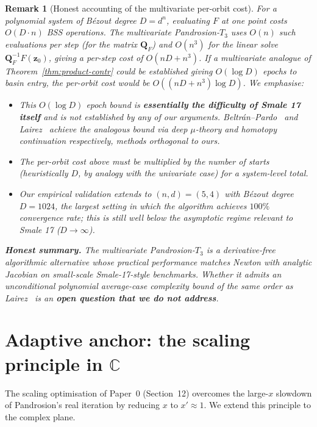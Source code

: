 \documentclass[11pt,a4paper]{article}
\newtheorem{remark}[theorem]{Remark}
\begin{document}
\begin{remark}[Honest accounting of the multivariate per-orbit cost]
For a polynomial system of B\'ezout degree $D = d^n$, evaluating $F$ at one point costs $O(D \cdot n)$ BSS operations. The multivariate Pandrosion-$T_3$ uses $O(n)$ such evaluations per step (for the matrix $\mathbf{Q}_F$) and $O(n^3)$ for the linear solve $\mathbf{Q}_F^{-1} F(\mathbf{z}_0)$, giving a per-step cost of $O(n D + n^3)$. \emph{If} a multivariate analogue of Theorem~\ref{thm:product-contr} could be established giving $O(\log D)$ epochs to basin entry, the per-orbit cost would be $O((nD + n^3) \log D)$. We emphasise:
\begin{itemize}
\item This $O(\log D)$ epoch bound is \textbf{essentially the difficulty of Smale 17 itself} and is \emph{not} established by any of our arguments. Beltr\'an--Pardo~\cite{beltranpardo} and Lairez~\cite{lairez} achieve the analogous bound via deep $\mu$-theory and homotopy continuation respectively, methods orthogonal to ours.
\item The per-orbit cost above must be multiplied by the number of starts (heuristically $D$, by analogy with the univariate case) for a system-level total.
\item Our empirical validation extends to $(n, d) = (5, 4)$ with B\'ezout degree $D = 1024$, the largest setting in which the algorithm achieves $100\%$ convergence rate; this is still well below the asymptotic regime relevant to Smale 17 ($D \to \infty$).
\end{itemize}
\textbf{Honest summary.} The multivariate Pandrosion-$T_3$ is a derivative-free algorithmic alternative whose \emph{practical} performance matches Newton with analytic Jacobian on small-scale Smale-17-style benchmarks. Whether it admits an unconditional polynomial average-case complexity bound \emph{of the same order} as Lairez~\cite{lairez} is an \textbf{open question that we do not address}.
\end{remark}

\section{Adaptive anchor: the scaling principle in $\mathbb{C}$}

The scaling optimisation of Paper~0 (Section~12) overcomes the large-$x$ slowdown of Pandrosion's real iteration by reducing $x$ to $x' \approx 1$. We extend this principle to the complex plane.
\end{document}
